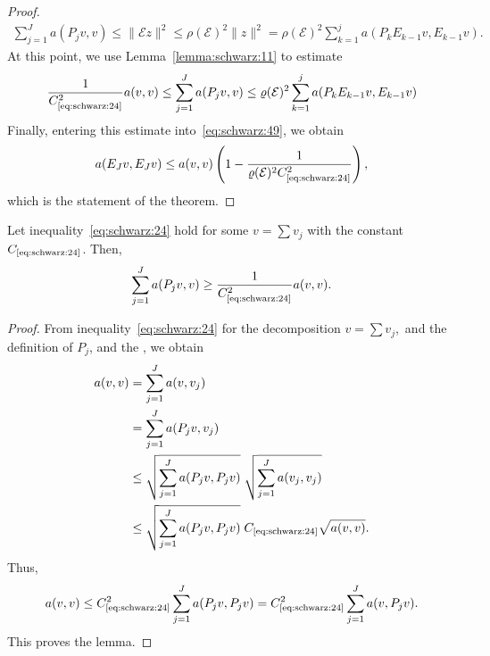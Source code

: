 \begin{proof}
  \begin{gather}
    \label{eq:schwarz:48}
    \sum_{j=1}^J a(P_j v,v) \le \|\mathcal E z\|^2
    \le \rho(\mathcal E)^2 \|z\|^2
    = \rho(\mathcal E)^2 \sum_{k=1}^{j} a(P_k E_{k-1} v,E_{k-1} v).
  \end{gather}
  At this point, we use Lemma~\ref{lemma:schwarz:11} to estimate
  \begin{gather*}
    \frac1{\constref{eq:schwarz:24}^2} a(v,v)
    \le \sum_{j=1}^J a(P_j v,v)
    \le \rho(\mathcal E)^2 \sum_{k=1}^{j} a(P_k E_{k-1} v,E_{k-1} v)
  \end{gather*}
  Finally, entering this estimate into~\eqref{eq:schwarz:49}, we
  obtain
  \begin{gather*}
    a(E_J v, E_J v)
    \le a(v,v) \left(1-\frac1{\rho(\mathcal
        E)^2\constref{eq:schwarz:24}^2}
      \right),
  \end{gather*}
  which is the statement of the theorem.
\end{proof}

\begin{lemma}
  \label{lemma:schwarz:11}
  Let inequality~\eqref{eq:schwarz:24} hold for some  $v=\sum v_j$ with the constant
  $\constref{eq:schwarz:24}$. Then,
  \begin{gather}
    \label{eq:schwarz:50}
    \sum_{j=1}^J a(P_j v,v) \ge \frac1{\constref{eq:schwarz:24}^2} a(v,v).
  \end{gather}
\end{lemma}

\begin{proof}
  From inequality~\eqref{eq:schwarz:24} for the decomposition $v=\sum
  v_j$,\ and the definition of $P_j$, and the
  , we obtain
  \begin{align*}
    a(v,v) &= \sum_{j=1}^J a(v,v_j) \\
    &= \sum_{j=1}^J a(P_j v, v_j) \\
    &\le \sqrt{\sum_{j=1}^J a(P_j v, P_j v)} \;\sqrt{\sum_{j=1}^J a(v_j,
      v_j)} \\
    & \le \sqrt{\sum_{j=1}^J a(P_j v, P_j v)}\;
    \constref{eq:schwarz:24} \sqrt{a(v,v)}.
  \end{align*}
  Thus,
  \begin{gather*}
    a(v,v) \le \constref{eq:schwarz:24}^2 \sum_{j=1}^J a(P_j v, P_j v)
    = \constref{eq:schwarz:24}^2 \sum_{j=1}^J a(v, P_j v).
  \end{gather*}
  This proves the lemma.
\end{proof}
